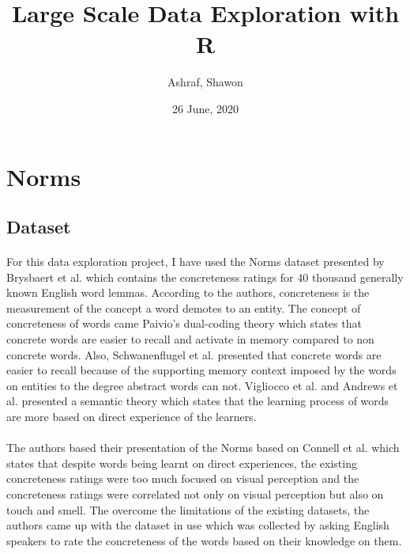 \documentclass[11pt,a4paper]{article}
\begin{document}
\title{Large Scale Data Exploration with R}
\author{Ashraf, Shawon}
\date{26 June, 2020}

\maketitle


\section{Norms}

\subsection{Dataset}

\paragraph{}
For this data exploration project, I have used the Norms dataset presented by Brysbaert et al. \cite{brys} which contains the concreteness ratings for 40 thousand generally known English word lemmas. According to the authors, concreteness is the measurement of the concept a word demotes to an entity. The concept of concreteness of words came Paivio’s dual-coding theory \cite{paivio} which states that concrete words are easier to recall and activate in memory compared to non concrete words. Also,  Schwanenflugel et al. \citep{schwanenflugel} presented that concrete words are easier to recall because of the supporting memory context imposed by the words on entities to the degree abstract words can not. Vigliocco et al. \cite{vigliocco_vinson_lewis_garrett_2004} and Andrews et al. \cite{andrews_vigliocco_vinson_2009} presented a semantic theory which states that the learning process of words are more based on direct experience of the learners.

\paragraph{}
The authors based their presentation of the Norms based on Connell et al. \cite{connell} which states that despite words being learnt on direct experiences, the existing concreteness ratings were too much focused on visual perception and the concreteness ratings were correlated not only on visual perception but also on touch and smell. The overcome the limitations of the existing datasets, the authors came up with the dataset in use which was collected by asking English speakers to rate the concreteness of the words based on their knowledge on them.
\end{document}
